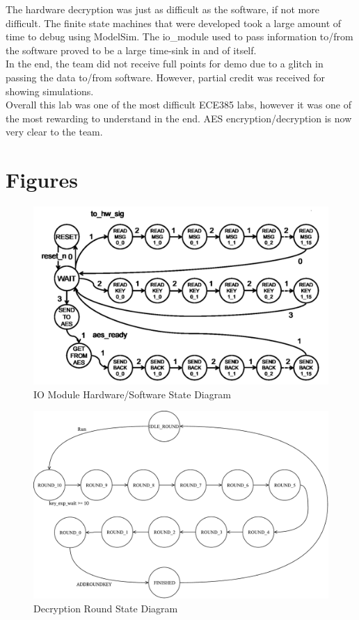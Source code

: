\documentclass[journal, twocolumn, final,11pt,letterpaper]{IEEEtran}
\begin{document}
The hardware decryption was just as difficult as the software, if not more difficult. The finite state machines that were developed took a large amount of time to debug using ModelSim. The io\_module used to pass information to/from the software proved to be a large time-sink in and of itself. \\

In the end, the team did not receive full points for demo due to a glitch in passing the data to/from software. However, partial credit was received for showing simulations.\\

Overall this lab was one of the most difficult ECE385 labs, however it was one of the most rewarding to understand in the end. AES encryption/decryption is now very clear to the team.

\clearpage
\onecolumn
\section{Figures}


\begin{figure} [H]
	\centering
	\includegraphics[scale=.6]{IO_Module_State_Diagram.png}
	\caption{IO Module Hardware/Software State Diagram\label{fig:io-module}}
\end{figure}  


\begin{figure} [H]
	\centering
	\includegraphics[scale=.6]{Decryption_Round_State_Diagram.pdf}
	\caption{Decryption Round State Diagram\label{fig:round-state}}
\end{figure}          
\end{document}
